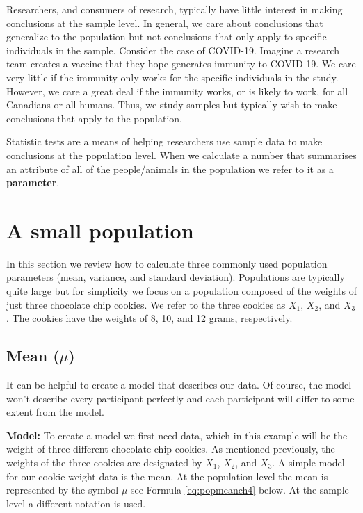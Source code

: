 \documentclass[
]{krantz}
\begin{document}
Researchers, and consumers of research, typically have little interest in making conclusions at the sample level. In general, we care about conclusions that generalize to the population but not conclusions that only apply to specific individuals in the sample. Consider the case of COVID-19. Imagine a research team creates a vaccine that they hope generates immunity to COVID-19. We care very little if the immunity only works for the specific individuals in the study. However, we care a great deal if the immunity works, or is likely to work, for all Canadians or all humans. Thus, we study samples but typically wish to make conclusions that apply to the population.

Statistic tests are a means of helping researchers use sample data to make conclusions at the population level. When we calculate a number that summarises an attribute of all of the people/animals in the population we refer to it as a \textbf{parameter}.

\hypertarget{a-small-population}{%
\section{A small population}\label{a-small-population}}

In this section we review how to calculate three commonly used population parameters (mean, variance, and standard deviation). Populations are typically quite large but for simplicity we focus on a population composed of the weights of just three chocolate chip cookies. We refer to the three cookies as \(X_1\), \(X_2\), and \(X_3\). The cookies have the weights of 8, 10, and 12 grams, respectively.

\hypertarget{mean-mu}{%
\subsection{\texorpdfstring{Mean (\(\mu\))}{Mean (\textbackslash mu)}}\label{mean-mu}}

It can be helpful to create a model that describes our data. Of course, the model won't describe every participant perfectly and each participant will differ to some extent from the model.

\textbf{Model:} To create a model we first need data, which in this example will be the weight of three different chocolate chip cookies. As mentioned previously, the weights of the three cookies are designated by \(X_1\), \(X_2\), and \(X_3\). A simple model for our cookie weight data is the mean. At the population level the mean is represented by the symbol \(\mu\) see Formula \eqref{eq:popmeanch4} below. At the sample level a different notation is used.
\end{document}
